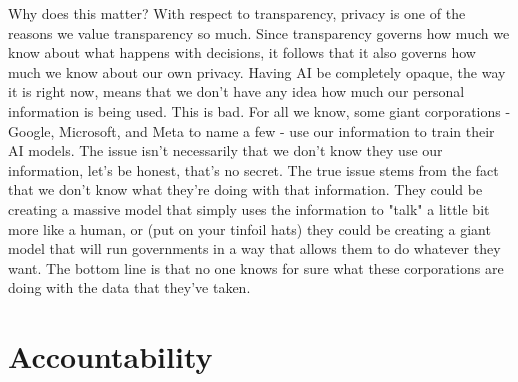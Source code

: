 \documentclass[12pt]{article}
\begin{document}
    Why does this matter? With respect to transparency, privacy is one of the reasons we value
    transparency so much. Since transparency governs how much we know about what happens with
    decisions, it follows that it also governs how much we know about our own privacy. Having AI
    be completely opaque, the way it is right now, means that we don't have any idea how much our
    personal information is being used. This is bad. For all we know, some giant corporations
    - Google, Microsoft, and Meta to name a few - use our information to train their AI models.
    The issue isn't necessarily that we don't know they use our information, let's be honest, 
    that's no secret. The true issue stems from the fact that we don't know what they're doing
    with that information. They could be creating a massive model that simply uses the information
    to "talk" a little bit more like a human, or (put on your tinfoil hats) they could be creating
    a giant model that will run governments in a way that allows them to do whatever they want.
    The bottom line is that no one knows for sure what these corporations are doing with the data
    that they've taken.

    \section{Accountability}
\end{document}
